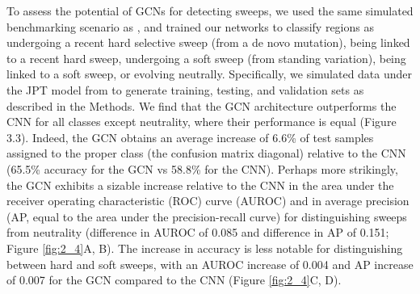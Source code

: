 To assess the potential of GCNs for detecting sweeps, we used the same simulated benchmarking scenario as \cite{flagelUnreasonableEffectivenessConvolutional2019}, and trained our networks to classify regions as undergoing a recent hard selective sweep (from a de novo mutation), being linked to a recent hard sweep, undergoing a soft sweep (from standing variation), being linked to a soft sweep, or evolving neutrally. Specifically, we simulated data under the JPT model from \cite{schriderSoftSweepsAre2017} to generate training, testing, and validation sets as described in the Methods. We find that the GCN architecture outperforms the CNN for all classes except neutrality, where their performance is equal (Figure 3.3). Indeed, the GCN obtains an average increase of 6.6\% of test samples assigned to the proper class (the confusion matrix diagonal) relative to the CNN (65.5\% accuracy for the GCN vs 58.8\% for the CNN). Perhaps more strikingly, the GCN exhibits a sizable increase relative to the CNN in the area under the receiver operating characteristic (ROC) curve (AUROC) and in average precision (AP, equal to the area under the precision-recall curve) for distinguishing sweeps from neutrality (difference in AUROC of 0.085 and difference in AP of 0.151; Figure \ref{fig:2_4}A, B). The increase in accuracy is less notable for distinguishing between hard and soft sweeps, with an AUROC increase of 0.004 and AP increase of 0.007 for the GCN compared to the CNN (Figure \ref{fig:2_4}C, D). 

